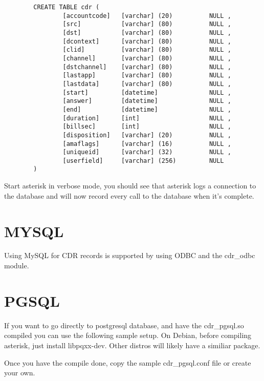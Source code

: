 \begin{astlisting}
\begin{verbatim}
		CREATE TABLE cdr (
		        [accountcode]   [varchar] (20)          NULL ,
		        [src]           [varchar] (80)          NULL ,
		        [dst]           [varchar] (80)          NULL ,
		        [dcontext]      [varchar] (80)          NULL ,
		        [clid]          [varchar] (80)          NULL ,
		        [channel]       [varchar] (80)          NULL ,
		        [dstchannel]    [varchar] (80)          NULL ,
		        [lastapp]       [varchar] (80)          NULL ,
		        [lastdata]      [varchar] (80)          NULL ,
		        [start]         [datetime]              NULL ,
		        [answer]        [datetime]              NULL ,
		        [end]           [datetime]              NULL ,
		        [duration]      [int]                   NULL ,
		        [billsec]       [int]                   NULL ,
		        [disposition]   [varchar] (20)          NULL ,
		        [amaflags]      [varchar] (16)          NULL ,
		        [uniqueid]      [varchar] (32)          NULL ,
		        [userfield]     [varchar] (256)         NULL
		)
\end{verbatim}
\end{astlisting}
                Start asterisk in verbose mode, you should see that asterisk
                logs a connection to the database and will now record every
                call to the database when it's complete.


\section{MYSQL}

Using MySQL for CDR records is supported by using ODBC and the cdr\_odbc module.

\section{PGSQL}
        If you want to go directly to postgresql database, and have the cdr\_pgsql.so
        compiled you can use the following sample setup.
        On Debian, before compiling asterisk, just install libpqxx-dev.
        Other distros will likely have a similiar package.

        Once you have the compile done,
        copy the sample cdr\_pgsql.conf file or create your own.

